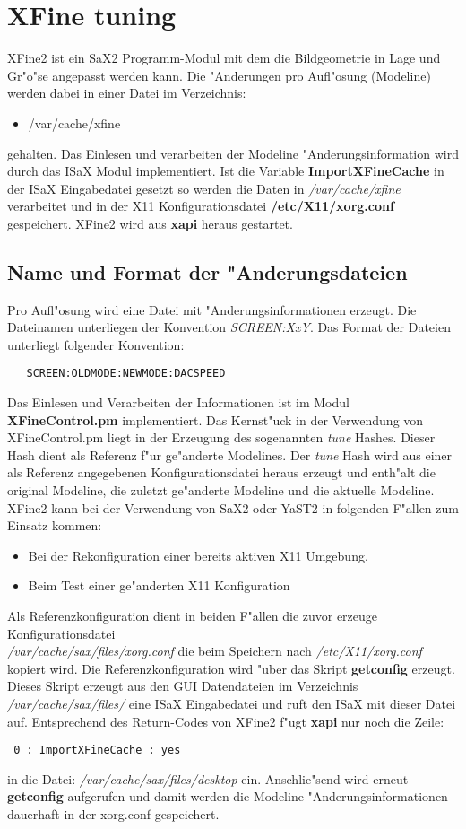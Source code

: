 \chapter{XFine tuning}
\label{cha:xfi}
\minitoc
XFine2 ist ein SaX2 Programm-Modul mit dem die Bildgeometrie
in Lage und Gr"o"se angepasst werden kann. Die "Anderungen pro
Aufl"osung (Modeline) werden dabei in einer Datei im Verzeichnis:
\begin{itemize}
\item /var/cache/xfine
\end{itemize}
gehalten. Das Einlesen und verarbeiten der Modeline "Anderungsinformation
wird durch das ISaX Modul implementiert. Ist die Variable 
\textbf{ImportXFineCache} in der ISaX Eingabedatei gesetzt so werden
die Daten in \textit{/var/cache/xfine} verarbeitet und in
der X11 Konfigurationsdatei \textbf{/etc/X11/xorg.conf} gespeichert.
XFine2 wird aus \textbf{xapi} heraus gestartet.

\section{Name und Format der "Anderungsdateien}
Pro Aufl"osung wird eine Datei mit "Anderungsinformationen erzeugt.
Die Dateinamen unterliegen der Konvention \textit{SCREEN:XxY}.
Das Format der Dateien unterliegt folgender Konvention:
\begin{verbatim}
   SCREEN:OLDMODE:NEWMODE:DACSPEED
\end{verbatim}

Das Einlesen und Verarbeiten der Informationen ist im Modul
\textbf{XFineControl.pm} implementiert. Das Kernst"uck in der 
Verwendung von XFineControl.pm liegt in der Erzeugung des 
sogenannten \textit{tune} Hashes. Dieser Hash dient 
als Referenz f"ur ge"anderte Modelines. Der \textit{tune} Hash wird
aus einer als Referenz angegebenen Konfigurationsdatei heraus
erzeugt und enth"alt die original Modeline, die zuletzt ge"anderte 
Modeline und die aktuelle Modeline. XFine2 kann bei der Verwendung
von SaX2 oder YaST2 in folgenden F"allen zum Einsatz kommen:
\begin{itemize}
\item Bei der Rekonfiguration einer bereits aktiven X11 Umgebung.
\item Beim Test einer ge"anderten X11 Konfiguration
\end{itemize}
Als Referenzkonfiguration dient in beiden F"allen die zuvor
erzeuge Konfigurationsdatei\\
\textit{/var/cache/sax/files/xorg.conf}
die beim Speichern nach \textit{/etc/X11/xorg.conf} kopiert wird.
Die Referenzkonfiguration wird "uber das Skript \textbf{getconfig}
erzeugt. Dieses Skript erzeugt aus den GUI Datendateien im Verzeichnis
\textit{/var/cache/sax/files/} eine ISaX Eingabedatei und ruft den
ISaX mit dieser Datei auf. Entsprechend des Return-Codes von XFine2 
f"ugt \textbf{xapi} nur noch die Zeile:
\begin{verbatim}
 0 : ImportXFineCache : yes
\end{verbatim}
in die Datei: \textit{/var/cache/sax/files/desktop} ein.
Anschlie"send wird erneut \textbf{getconfig} aufgerufen und damit werden
die Modeline-"Anderungsinformationen dauerhaft in der xorg.conf
gespeichert.

